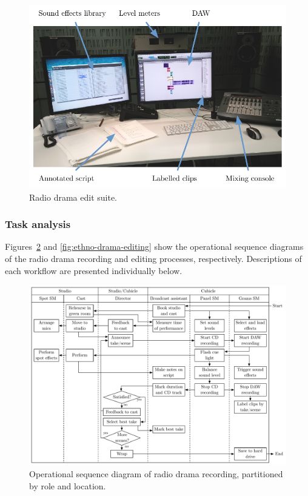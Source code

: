 \begin{figure}
  \centering
  \includegraphics[width=\columnwidth]{figs/drama-edit-labelled.pdf}
  \caption{Radio drama edit suite.}
  \label{fig:drama-edit}
\end{figure}

\subsubsection{Task analysis}
Figures~\ref{fig:ethno-drama-recording} and \ref{fig:ethno-drama-editing} show the operational sequence diagrams of the
radio drama recording and editing processes, respectively. Descriptions of each workflow are presented individually
below.

\begin{figure}
  \centering
  \includegraphics[angle=90,width=\columnwidth]{figs/drama-recording-workflow.pdf}
  \caption{Operational sequence diagram of radio drama recording, partitioned by role and location.}
  \label{fig:ethno-drama-recording}
\end{figure}

